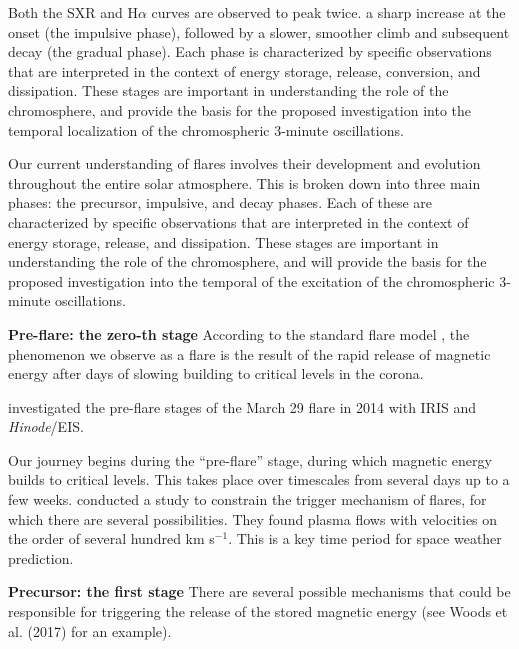 Both the SXR and H$\alpha$ curves are observed to peak twice.
a sharp increase at the onset (the impulsive phase),
followed by a slower, smoother climb and subsequent decay (the gradual phase).
Each phase is characterized by specific observations that are interpreted in
the context of energy storage, release, conversion, and dissipation. These
stages are important in understanding the role of the chromosphere, and provide
the basis for the proposed investigation into the temporal localization of the
chromospheric 3-minute oscillations.

Our current understanding of flares involves their development and evolution
throughout the entire solar atmosphere. This is broken down into three main
phases: the precursor, impulsive, and decay phases. Each of these are
characterized by specific observations that are interpreted in the context of
energy storage, release, and dissipation. These stages are important in
understanding the role of the chromosphere, and will provide the basis for the
proposed investigation into the temporal of the excitation of the chromospheric
3-minute oscillations.

\textbf{Pre-flare: the zero-th stage}\quad
According to the standard flare model ,
the phenomenon we observe as a flare is the result of the rapid
release of magnetic energy after
days of slowing building to critical levels in the corona.

\cite{Woods2017} investigated the pre-flare stages of
the March 29 flare in 2014
with IRIS and \textit{Hinode}/EIS.


Our journey begins during the ``pre-flare'' stage, during which magnetic energy
builds to critical levels.
This takes place over timescales from several days up to a few weeks.
\cite{Woods2017}
conducted a study to constrain the trigger mechanism
of flares, for which there are several possibilities. They found plasma flows
with velocities on the order of several hundred km s$^{-1}$.
This is a key time period for space weather prediction.




\textbf{Precursor: the first stage}\quad
There are several possible mechanisms that could be responsible for triggering
the release of the stored magnetic energy (see Woods et al. (2017) for an
example).

